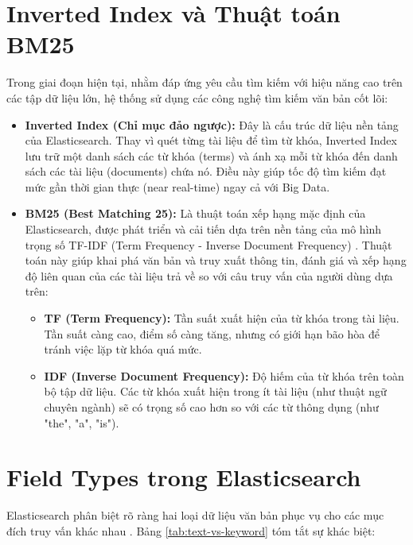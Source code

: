 \section{Inverted Index và Thuật toán BM25}
Trong giai đoạn hiện tại, nhằm đáp ứng yêu cầu tìm kiếm với hiệu năng cao trên các tập dữ liệu lớn, hệ thống sử dụng các công nghệ tìm kiếm văn bản cốt lõi:
\begin{itemize}
    \item \textbf{Inverted Index (Chỉ mục đảo ngược):} Đây là cấu trúc dữ liệu nền tảng của Elasticsearch. Thay vì quét từng tài liệu để tìm từ khóa, Inverted Index lưu trữ một danh sách các từ khóa (terms) và ánh xạ mỗi từ khóa đến danh sách các tài liệu (documents) chứa nó. Điều này giúp tốc độ tìm kiếm đạt mức gần thời gian thực (near real-time) ngay cả với Big Data.
    \item \textbf{BM25 (Best Matching 25):} Là thuật toán xếp hạng mặc định của Elasticsearch, được phát triển và cải tiến dựa trên nền tảng của mô hình trọng số TF-IDF (Term Frequency - Inverse Document Frequency) \cite{robertson2009bm25}. Thuật toán này giúp khai phá văn bản và truy xuất thông tin, đánh giá và xếp hạng độ liên quan của các tài liệu trả về so với câu truy vấn của người dùng dựa trên:
    \begin{itemize}
        \item \textbf{TF (Term Frequency):} Tần suất xuất hiện của từ khóa trong tài liệu. Tần suất càng cao, điểm số càng tăng, nhưng có giới hạn bão hòa để tránh việc lặp từ khóa quá mức.
        \item \textbf{IDF (Inverse Document Frequency):} Độ hiếm của từ khóa trên toàn bộ tập dữ liệu. Các từ khóa xuất hiện trong ít tài liệu (như thuật ngữ chuyên ngành) sẽ có trọng số cao hơn so với các từ thông dụng (như "the", "a", "is").
    \end{itemize}
\end{itemize}

\section{Field Types trong Elasticsearch}
Elasticsearch phân biệt rõ ràng hai loại dữ liệu văn bản phục vụ cho các mục đích truy vấn khác nhau \cite{elasticsearch_docs}. Bảng \ref{tab:text-vs-keyword} tóm tắt sự khác biệt:


